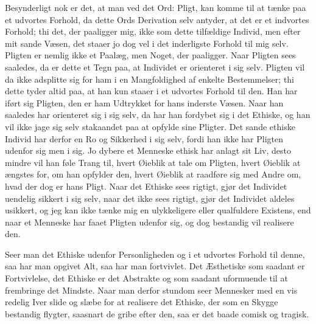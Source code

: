 \documentclass[12pt,a4paper]{article}
\begin{document}
Besynderligt nok er det, at man ved det Ord: Pligt, kan komme til at tænke paa et udvortes Forhold, da dette Ords Derivation selv antyder, at det er et indvortes Forhold; thi det, der paaligger mig, ikke som dette tilfældige Individ, men efter mit sande Væsen, det staaer jo dog vel i det inderligste Forhold til mig selv. Pligten er nemlig ikke et Paalæg, men Noget, der paaligger. Naar Pligten sees saaledes, da er dette et Tegn paa, at Individet er orienteret i sig selv. Pligten vil da ikke adsplitte sig for ham i en Mangfoldighed af enkelte Bestemmelser; thi dette tyder altid paa, at han kun staaer i et udvortes Forhold til den. Han har iført sig Pligten, den er ham Udtrykket for hans inderste Væsen. Naar han saaledes har orienteret sig i sig selv, da har han fordybet sig i det Ethiske, og han vil ikke jage sig selv stakaandet paa at opfylde sine Pligter. Det sande ethiske Individ har derfor en Ro og Sikkerhed i sig selv, fordi han ikke har Pligten udenfor sig men i sig. Jo dybere et Menneske ethisk har anlagt sit Liv, desto mindre vil han føle Trang til, hvert Øieblik at tale om Pligten, hvert Øieblik at ængstes for, om han opfylder den, hvert Øieblik at raadføre sig med Andre om, hvad der dog er hans Pligt. Naar det Ethiske sees rigtigt, gjør det Individet uendelig sikkert i sig selv, naar det ikke sees rigtigt, gjør det Individet aldeles usikkert, og jeg kan ikke tænke mig en ulykkeligere eller qualfuldere Existens, end naar et Menneske har faaet Pligten udenfor sig, og dog bestandig vil realisere den.

Seer man det Ethiske udenfor Personligheden og i et udvortes Forhold til denne, saa har man opgivet Alt, saa har man fortvivlet. Det Æsthetiske som saadant er Fortvivlelse, det Ethiske er det Abstrakte og som saadant uformuende til at frembringe det Mindste. Naar man derfor stundom seer Mennesker med en vis redelig Iver slide og slæbe for at realisere det Ethiske, der som en Skygge bestandig flygter, saasnart de gribe efter den, saa er det baade comisk og tragisk.
\end{document}
